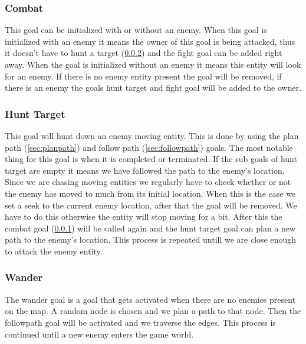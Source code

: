 \subsubsection{Combat} 
\label{sec:combat} 
This goal can be initialized with or without an enemy. When this goal is 
initialized with an enemy it means the owner of this goal is being attacked, 
thus it doesn’t have to hunt a target (\cref{sec:hunttarget}) and the fight 
goal can be added right away. When the goal is initialized without an enemy it 
means this entity will look for an enemy. If there is no enemy entity present 
the goal will be removed, if there is an enemy the goals hunt target and fight 
goal will be added to the owner.

\subsubsection{Hunt Target} 
\label{sec:hunttarget} 
This goal will hunt down an enemy moving entity. This is done by using the 
plan path (\cref{sec:planpath}) and follow path (\cref{sec:followpath}) goals. 
The most notable thing for this goal is when it is completed or terminated. If 
the sub goals of hunt target are empty it means we have followed the path to 
the enemy’s location. Since we are chasing moving entities we regularly have 
to check whether or not the enemy has moved to much from its initial location. 
When this is the case we set a seek to the current enemy location, after that 
the goal will be removed. We have to do this otherwise the entity will stop 
moving for a bit. After this the combat goal (\cref{sec:combat}) will be called 
again and the hunt target goal can plan a new path to the enemy’s location. 
This process is repeated untill we are close enough to attack the enemy entity.

\subsubsection{Wander} 
The wander goal is a goal that gets activated when there are no enemies 
present on the map. A random node is chosen and we plan a path to that node. 
Then the followpath goal will be activated and we traverse the edges. This 
process is continued until a new enemy enters the game world.
